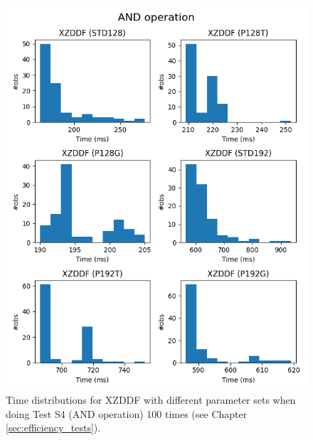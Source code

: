 \begin{figure}[ht]
    \centering
    \includegraphics[width=\textwidth]{data/figures/AND_operation_distributions_2.png}
    \caption{Time distributions for XZDDF with different parameter sets when doing Test S4 (AND operation) 100 times (see Chapter \ref{sec:efficiency_tests}).}
    \label{fig:distr_and2}
\end{figure}


